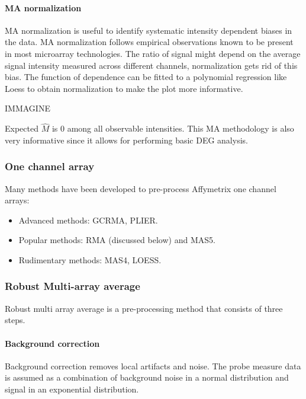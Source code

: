 			\paragraph{MA normalization}
			MA normalization is useful to identify systematic intensity dependent biases in the data.
			MA normalization follows empirical observations known to be present in most microarray technologies.
			The ratio of signal might depend on the average signal intensity measured across different channels, normalization gets rid of this bias.
			The function of dependence can be fitted to a polynomial regression like Loess to obtain normalization to make the plot more informative.

			\begin{center}
				IMMAGINE
			\end{center}

			Expected $\hat{M}$ is $0$ among all observable intensities.
			This MA methodology is also very informative since it allows for performing basic DEG analysis.

		\subsubsection{One channel array}
		Many methods have been developed to pre-process Affymetrix one channel arrays:

		\begin{multicols}{3}
			\begin{itemize}
				\item Advanced methods: GCRMA, PLIER.
				\item Popular methods: RMA (discussed below) and MAS5.
				\item Rudimentary methods: MAS4, LOESS.
			\end{itemize}
		\end{multicols}

		\subsubsection{Robust Multi-array average}
		Robust multi array average is a pre-processing method that consists of three steps.

			\paragraph{Background correction}
			Background correction removes local artifacts and noise.
			The probe measure data is assumed as a combination of background noise in a normal distribution and signal in an exponential distribution.

